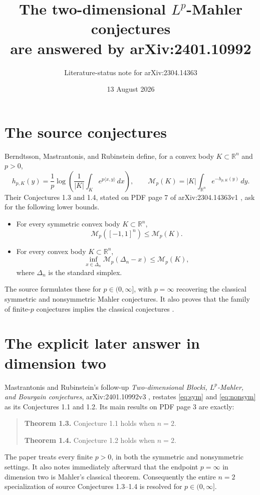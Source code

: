 \documentclass[11pt]{article}
\title{The two-dimensional $L^p$-Mahler conjectures\\
are answered by arXiv:2401.10992}
\author{Literature-status note for arXiv:2304.14363}
\date{13 August 2026}
\newcommand{\R}{\mathbb R}
\newcommand{\Mp}{\mathcal M_p}
\newcommand{\D}{\Delta}
\begin{document}
\maketitle

\begin{center}
\end{center}

\section{The source conjectures}

Berndtsson, Mastrantonis, and Rubinstein define, for a convex body
$K\subset\R^n$ and $p>0$,
\[
 h_{p,K}(y)=\frac1p\log\left(\frac1{|K|}
 \int_K e^{p\langle x,y\rangle}\,dx\right),
 \qquad
 \Mp(K)=|K|\int_{\R^n}e^{-h_{p,K}(y)}\,dy.
\]
Their Conjectures 1.3 and 1.4, stated on PDF page 7 of
arXiv:2304.14363v1 \cite{BMR}, ask for the following lower bounds.

\begin{itemize}
\item For every symmetric convex body $K\subset\R^n$,
\begin{equation}\label{eq:sym}
 \Mp([-1,1]^n)\leq \Mp(K).
\end{equation}
\item For every convex body $K\subset\R^n$,
\begin{equation}\label{eq:nonsym}
 \inf_{x\in\D_n}\Mp(\D_n-x)\leq\Mp(K),
\end{equation}
where $\D_n$ is the standard simplex.
\end{itemize}

The source formulates these for $p\in(0,\infty]$, with $p=\infty$ recovering
the classical symmetric and nonsymmetric Mahler conjectures.  It also proves
that the family of finite-$p$ conjectures implies the classical conjectures
\cite[Lemma 3.12]{BMR}.

\section{The explicit later answer in dimension two}

Mastrantonis and Rubinstein's follow-up
\emph{Two-dimensional B\l{}ocki, $L^p$-Mahler, and Bourgain conjectures},
arXiv:2401.10992v3 \cite{MR}, restates \eqref{eq:sym} and
\eqref{eq:nonsym} as its Conjectures 1.1 and 1.2.  Its main results on PDF
page 3 are exactly:
\begin{quote}
\textbf{Theorem 1.3.} Conjecture 1.1 holds when $n=2$.

\textbf{Theorem 1.4.} Conjecture 1.2 holds when $n=2$.
\end{quote}
The paper treats every finite $p>0$, in both the symmetric and nonsymmetric
settings.  It also notes immediately afterward that the endpoint $p=\infty$
in dimension two is Mahler's classical theorem.  Consequently the entire
$n=2$ specialization of source Conjectures 1.3--1.4 is resolved for
$p\in(0,\infty]$.
\end{document}
